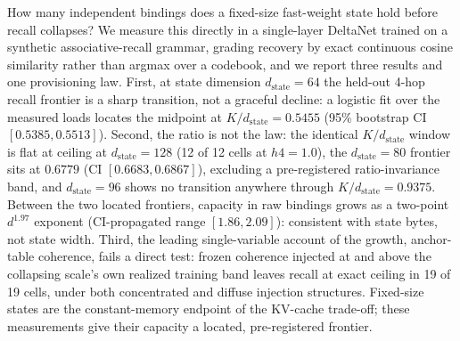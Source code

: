 How many independent bindings does a fixed-size fast-weight state hold
before recall collapses? We measure this directly in a single-layer
DeltaNet trained on a synthetic associative-recall grammar, grading
recovery by exact continuous cosine similarity rather than argmax over a
codebook, and we report three results and one provisioning law. First, at
state dimension $d_{\mathrm{state}}=64$ the held-out 4-hop recall frontier is
a sharp transition, not a graceful decline: a logistic fit over the measured
loads locates the midpoint at $K/d_{\mathrm{state}} = 0.5455$ (95\%
bootstrap CI $[0.5385, 0.5513]$). %
Second, the ratio is not the law: the identical $K/d_{\mathrm{state}}$
window is flat at ceiling at $d_{\mathrm{state}}=128$ (12 of 12 cells at
$h4=1.0$), %
the $d_{\mathrm{state}}=80$ frontier sits at $0.6779$ (CI
$[0.6683, 0.6867]$), excluding a pre-registered ratio-invariance band,
and $d_{\mathrm{state}}=96$ shows no transition anywhere through
$K/d_{\mathrm{state}}=0.9375$. %
Between the two located frontiers, capacity in raw bindings grows as a
two-point $d^{1.97}$ exponent (CI-propagated range $[1.86, 2.09]$):
consistent with state bytes, not state width. %
Third, the leading single-variable account of the growth, anchor-table
coherence, fails a direct test: frozen coherence injected at and above the
collapsing scale's own realized training band leaves recall at exact
ceiling in 19 of 19 cells, under both concentrated and diffuse injection
structures. %
Fixed-size states are the constant-memory endpoint of the KV-cache
trade-off; these measurements give their capacity a located,
pre-registered frontier.
